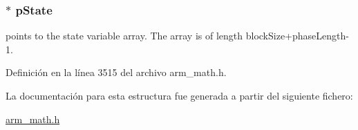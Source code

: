 \subsubsection[{\texorpdfstring{p\+State}{pState}}]{$\ast$ p\+State}\hypertarget{structarm__fir__interpolate__instance__q31_adee4ba3ee8869865af7d8fa08ca913d6}{}\label{structarm__fir__interpolate__instance__q31_adee4ba3ee8869865af7d8fa08ca913d6}
points to the state variable array. The array is of length block\+Size+phase\+Length-\/1. 

Definición en la línea 3515 del archivo arm\+\_\+math.\+h.



La documentación para esta estructura fue generada a partir del siguiente fichero\+:\begin{DoxyCompactItemize}
\item 
\hyperlink{arm__math_8h}{arm\+\_\+math.\+h}\end{DoxyCompactItemize}
